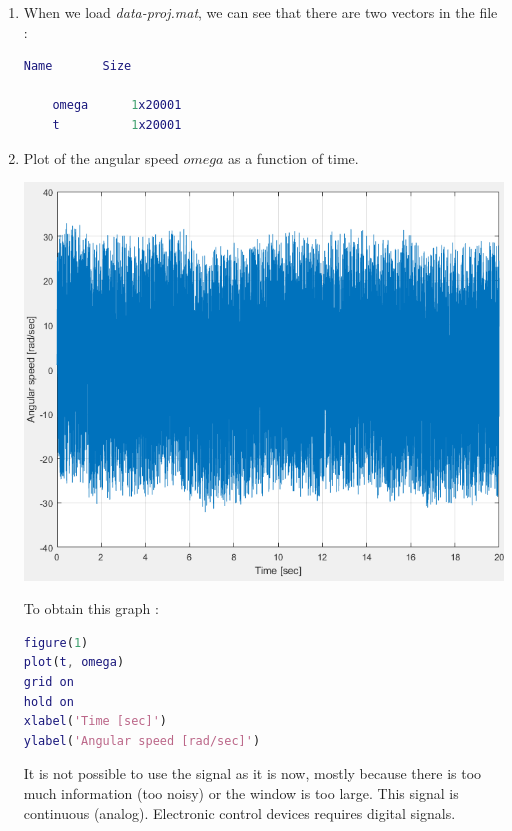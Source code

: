 \documentclass[a4paper,12pt]{article}
\begin{document}
\begin{enumerate}[label={\color{blue}\arabic*)}]

    \item
    When we load \textit{data-proj.mat}, we can see that there are two vectors in the file :
    \begin{lstlisting}[style=Matlab-editor,language=Matlab]
    Name       Size

    omega      1x20001
    t          1x20001

    \end{lstlisting}

    \item
    Plot of the angular speed \(omega\) as a function of time.

    \begin{multicols}{2}

        \begin{flushleft}
            \includegraphics[scale=0.35]{Images/Figure 1.png}
            \label{Figure1}
        \end{flushleft}

    \columnbreak

    To obtain this graph :

    \begin{lstlisting}[style=Matlab-editor,language=Matlab, basicstyle=\small\ttfamily]
figure(1)
plot(t, omega)
grid on
hold on
xlabel('Time [sec]')
ylabel('Angular speed [rad/sec]')
        \end{lstlisting}

    \end{multicols}

    It is not possible to use the signal as it is now, mostly because there is too much information (too noisy) or the window is too large. This signal is continuous (analog). Electronic control devices requires digital signals.

\end{enumerate}
\end{document}
